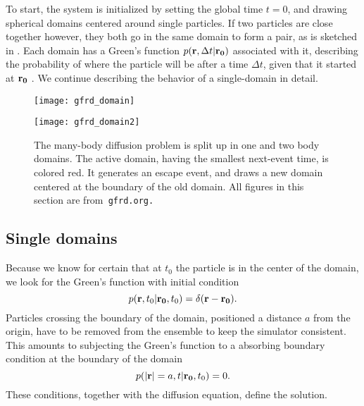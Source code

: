 To start, the system is initialized by setting the global time $t=0$, and drawing spherical domains centered around single particles. If two particles are close together however, they both go in the same domain to form a pair, as is sketched in . Each domain has a Green's function $p({\bf r}, \Delta t|{\bf r_0})$ associated with it, describing the probability of where the particle will be after a time $\Delta t$, given that it started at ${\bf r_0}$ \cite{Carslaw1959}. We continue describing the behavior of a single-domain in detail.

\begin{figure}[ht]
\begin{minipage}[ht]{.5\linewidth}
\centering
\texttt{[image: gfrd\_domain]}
\end{minipage}
\begin{minipage}[ht]{.5\linewidth}
\centering
\texttt{[image: gfrd\_domain2]}
\end{minipage}
\caption{ The many-body diffusion problem is split up in one and two body domains. The active domain, having the smallest next-event time, is colored red. It generates an escape event, and draws a new domain centered at the boundary of the old domain. All figures in this section are from\tt{ gfrd.org}.}
\end{figure}

\subsection{Single domains}
Because we know for certain that at $t_0$ the particle is in the center of the domain, we look for the Green's function with initial condition
\begin{equation}
 p({\bf r}, t_0|{\bf r_0},t_0) = \delta(\mathbf{r - r_0}).
\end{equation}
Particles crossing the boundary of the domain, positioned a distance $a$ from the origin, have to be removed from the ensemble to keep the simulator consistent. This amounts to subjecting the Green's function to a absorbing boundary condition at the boundary of the domain
\begin{equation}
 p({\bf |r|}=a, t|{\bf r_0},t_0) = 0.
\end{equation}
These conditions, together with the diffusion equation, define the solution. \cite{Carslaw1959}\cite{Beck1992} 

